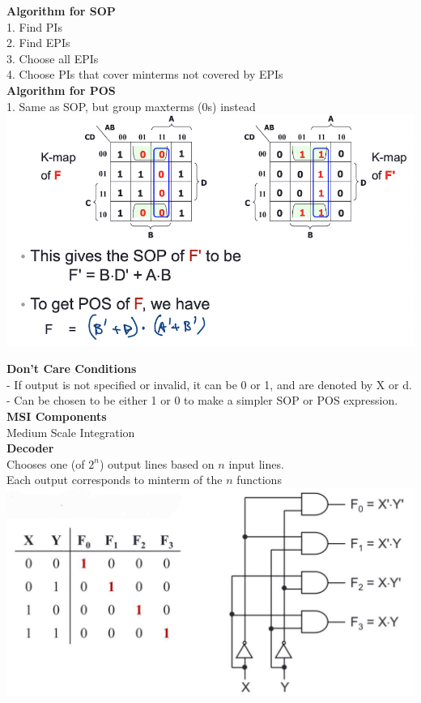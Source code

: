 \documentclass[10pt, a4paper]{article}
\begin{document}
\begin{multicols*}{3}
		\textbf{Algorithm for SOP}\\
		1. Find PIs\\
		2. Find EPIs\\
		3. Choose all EPIs\\
		4. Choose PIs that cover minterms not covered by EPIs\\
		
		\textbf{Algorithm for POS}\\
		1. Same as SOP, but group maxterms (0s) instead
		\includegraphics[scale=.45]{./assets/POSKmap}
		
		\textbf{Don't Care Conditions}\\
		- If output is not specified or invalid, it can be 0 or 1, and are denoted by X or d.\\
		- Can be chosen to be either 1 or 0 to make a simpler SOP or POS expression.\\

		{\normalsize\textbf{MSI Components}}\\
		Medium Scale Integration\\

		\textbf{Decoder}\\
		Chooses one (of $2^n$) output lines based on $n$ input lines. \\
		Each output corresponds to minterm of the $n$ functions\\
		\includegraphics[scale=.18]{./assets/decoder}


\end{multicols*}
\end{document}
